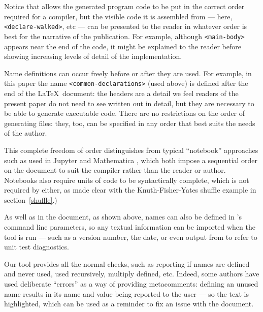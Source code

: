 \documentclass[prodmode,acmtecs]{acmsmall} %
\begin{document}
Notice that  allows the generated program code to be put in the correct order required for a compiler, but the visible code it is assembled from --- here, \verb|<declare-walked>|, etc --- can be presented to the reader in whatever order is best for the narrative of the publication. For example, although \verb|<main-body>| appears near the end of the code, it might be explained to the reader before showing increasing levels of detail of the implementation. 

Name definitions can occur freely before or after they are used. For example, in this paper the name \verb|<common-declarations>| (used above) is defined after the end of the \LaTeX\ document: the headers are a detail we feel readers of the present paper do not need to see written out in detail, but they are necessary to be able to generate executable code. There are no restrictions on the order of generating files: they, too, can be specified in any order that best suits the needs of the author. 

This complete freedom of order distinguishes  from typical ``notebook'' approaches such as used in Jupyter \cite{jupyter} and Mathematica \cite{mathematica}, which both impose a sequential order on the document to suit the compiler rather than the reader or author. Notebooks also require units of code to be syntactically complete, which is not required by  either, as made clear with the Knuth-Fisher-Yates shuffle example in section~\ref{shuffle}.)



As well as in the document, as shown above, names can also be defined in 's command line parameters, so any textual information can be imported when the tool is run --- such as a version number, the date, or even output from  to refer to unit test diagnostics. 

Our tool  provides all the normal checks, such as reporting if names are defined and never used, used recursively, multiply defined, etc. 
Indeed, some authors have used deliberate ``errors'' as a way of providing metacomments: defining an unused name results in its name and value being reported to the user --- so the text is highlighted, which can be used as a reminder to fix an issue with the document. 
\end{document}
